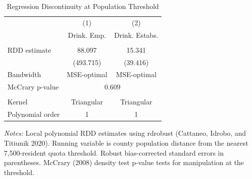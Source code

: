 \begin{table}[htbp]
\centering
\caption{Regression Discontinuity at Population Threshold}
\label{tab:rdd}
\begin{tabular}{lcc}
\hline\hline
 & (1) & (2) \\
 & Drink. Emp. & Drink. Estabs. \\
\hline
\\[-1.8ex]
RDD estimate & 88.097 & 15.341 \\
 & (493.715) & (39.416) \\
Bandwidth & MSE-optimal & MSE-optimal \\
McCrary p-value & \multicolumn{2}{c}{0.609} \\
\\[-1.8ex]
Kernel & Triangular & Triangular \\
Polynomial order & 1 & 1 \\
\hline\hline
\end{tabular}
\begin{tablenotes}
\small
\item \textit{Notes:} Local polynomial RDD estimates using rdrobust (Cattaneo, Idrobo, and Titiunik 2020). Running variable is county population distance from the nearest 7,500-resident quota threshold. Robust bias-corrected standard errors in parentheses. McCrary (2008) density test p-value tests for manipulation at the threshold.
\end{tablenotes}
\end{table}
